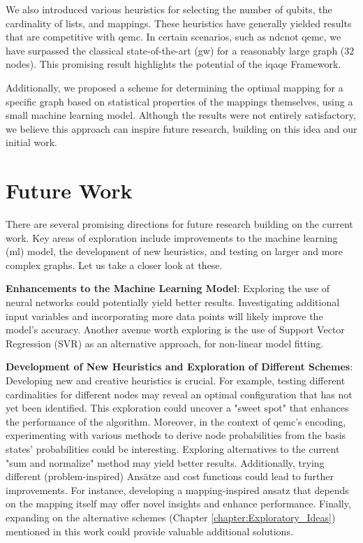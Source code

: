 We also introduced various heuristics for selecting the number of qubits, the cardinality of lists, and mappings. These heuristics have generally yielded results that are competitive with \acrshort{qemc}. In certain scenarios, such as \acrshort{ndcnot} \acrshort{qemc}, we have surpassed the classical state-of-the-art (\acrshort{gw}) for a reasonably large graph ($32$ nodes). This promising result highlights the potential of the \acrshort{iqaqe} Framework. %

Additionally, we proposed a scheme for determining the optimal mapping for a specific graph based on statistical properties of the mappings themselves, using a small machine learning model. Although the results were not entirely satisfactory, we believe this approach can inspire future research, building on this idea and our initial work. %


\section{Future Work}
\label{section:future}
There are several promising directions for future research building on the current work. Key areas of exploration include improvements to the machine learning (\acrshort{ml}) model, the development of new heuristics, and testing on larger and more complex graphs. Let us take a closer look at these.
\vspace{5mm}

\noindent\textbf{Enhancements to the Machine Learning Model}: %
\noindent Exploring the use of neural networks could potentially yield better results. Investigating additional input variables and incorporating more data points will likely improve the model's accuracy. Another avenue worth exploring is the use of Support Vector Regression (SVR) as an alternative approach, for non-linear model fitting.
\vspace{5mm}

\noindent\textbf{Development of New Heuristics and Exploration of Different Schemes}: Developing new and creative heuristics is crucial. For example, testing different cardinalities for different nodes may reveal an optimal configuration that has not yet been identified. This exploration could uncover a "sweet spot" that enhances the performance of the algorithm. Moreover, in the context of \acrshort{qemc}'s encoding, experimenting with various methods to derive node probabilities from the basis states' probabilities could be interesting. Exploring alternatives to the current "sum and normalize" method may yield better results. Additionally, trying different (problem-inspired) Ansätze and cost functions could lead to further improvements. For instance, developing a mapping-inspired ansatz that depends on the mapping itself may offer novel insights and enhance performance. Finally, expanding on the alternative schemes (Chapter \ref{chapter:Exploratory_Ideas}) mentioned in this work could provide valuable additional solutions.
\vspace{5mm}

